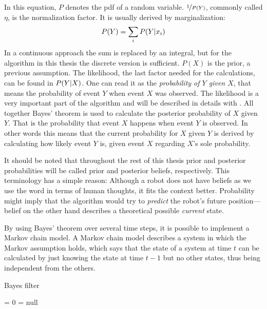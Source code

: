 \documentclass[Thesis.tex]{subfiles}
\begin{document}
In this equation, $P$ denotes the \gls{pdf} of a random variable. $\nicefrac{1}{P(Y)}$, commonly called $\eta$, is the normalization factor. It is usually derived by marginalization: 
\begin{align}
P(Y) = \sum\limits_i \p[P]{Y}{x_i}
\end{align}
In a continuous approach the sum is replaced by an integral, but for the algorithm in this thesis the discrete version is sufficient. $P(X)$ is the prior, a previous assumption.
The likelihood, the last factor needed for the calculations, can be found in $\p[P]{Y}{X}$. One can read it as the \emph{probability of $Y$ given $X$}, that means the probability of event $Y$ when event $X$ was observed. 
The likelihood is a very important part of the algorithm and will be described in details with . All together Bayes' theorem is used to calculate the posterior probability of $X$ given $Y$. That is the probability that event $X$ happens when event $Y$ is observed. In other words this means that the current probability for $X$ given $Y$ is derived by calculating how likely event $Y$ is, given event $X$ regarding $X$'s sole probability. 

It should be noted that throughout the rest of this thesis prior and posterior probabilities will be called prior and posterior beliefs, respectively. This terminology has a simple reason: Although a robot does not have beliefs as we use the word in terms of human thoughts, it fits the context better. Probability might imply that the algorithm would try to \emph{predict} the robot's future position---belief on the other hand describes a theoretical possible \emph{current} state.

\bigskip

By using Bayes' theorem over several time steps, it is possible to implement a Markov chain model. A Markov chain model describes a system in which the Markov assumption holds, which says that the state of a system at time $t$ can be calculated by just knowing the state at time $t-1$ but no other states, thus being independent from the others.

\begin{algorithm}
\caption{Bayes filter}
\label{alg:bayesfilter}

\bayesfilter{} {
  \belief = 0\;
  \guess = null\;
}
\end{algorithm}
\end{document}
